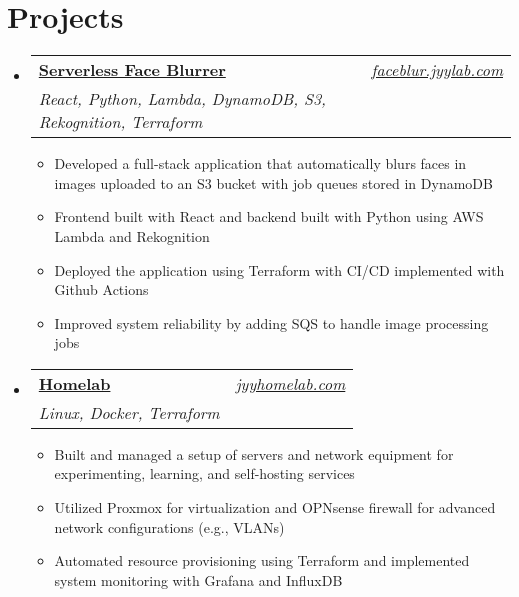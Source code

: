 \documentclass[letterpaper,11pt]{article}
\makeatletter
\newcommand{\resumeItem}[1]{
  \item\small{
    {#1 \vspace{-2pt}}
  }
}
\newcommand{\resumeSubheading}[4]{
  \vspace{-2pt}\item
    \begin{tabular*}{0.97\textwidth}[t]{l@{\extracolsep{\fill}}r}
      \textbf{#1} & #2 \\
      \textit{\small#3} & \textit{\small #4} \\
    \end{tabular*}\vspace{-7pt}
}
\newcommand{\resumeSubHeadingListStart}{\begin{itemize}[leftmargin=0.08in, label={}]}
\newcommand{\resumeSubHeadingListEnd}{\end{itemize}}
\newcommand{\resumeItemListStart}{\begin{itemize}[leftmargin=0.22in]}
\newcommand{\resumeItemListEnd}{\end{itemize}\vspace{-5pt}}
\makeatother
\begin{document}
\section{Projects}
    \resumeSubHeadingListStart
        \resumeSubheading
            {\textbf{\href{https://faceblur.jyylab.com}{Serverless Face Blurrer}}}{\emph{\href{https://faceblur.jyylab.com}{faceblur.jyylab.com}}}
            {React, Python, Lambda, DynamoDB, S3, Rekognition, Terraform}{}
            \resumeItemListStart
                \resumeItem{Developed a full-stack application that automatically blurs faces in images uploaded to an S3 bucket with job queues stored in DynamoDB}
                \resumeItem{Frontend built with React and backend built with Python using AWS Lambda and Rekognition}
                \resumeItem{Deployed the application using Terraform with CI/CD implemented with Github Actions}
                \resumeItem{Improved system reliability by adding SQS to handle image processing jobs}
            \resumeItemListEnd
        \resumeSubheading
            {\textbf{\href{https://github.com/jamesyoung-15/homelab}{Homelab}}}{\emph{\href{https://jyyhomelab.com}{jyyhomelab.com}}}
            {Linux, Docker, Terraform}{}
            \resumeItemListStart
            \resumeItem{Built and managed a setup of servers and network equipment for experimenting, learning, and self-hosting services}
            \resumeItem{Utilized Proxmox for virtualization and OPNsense firewall for advanced network configurations (e.g., VLANs)}
            \resumeItem{Automated resource provisioning using Terraform and implemented system monitoring with Grafana and InfluxDB}
            \resumeItemListEnd
    \resumeSubHeadingListEnd
\end{document}

